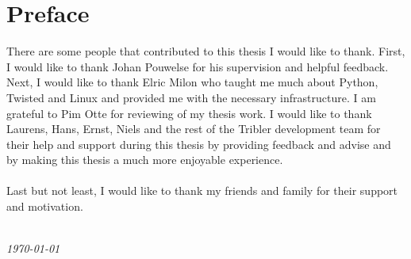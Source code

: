 \chapter*{Preface}

There are some people that contributed to this thesis I would like to thank. First, I would like to thank Johan Pouwelse for his supervision and helpful feedback. Next, I would like to thank Elric Milon who taught me much about Python, Twisted and Linux and provided me with the necessary infrastructure. I am grateful to Pim Otte for reviewing of my thesis work. I would like to thank Laurens, Hans, Ernst, Niels and the rest of the Tribler development team for their help and support during this thesis by providing feedback and advise and by making this thesis a much more enjoyable experience.\\\\
Last but not least, I would like to thank my friends and family for their support and motivation.

\begin{flushright}
{\makeatletter\itshape
    \@author \\
    \today
\makeatother}
\end{flushright}
